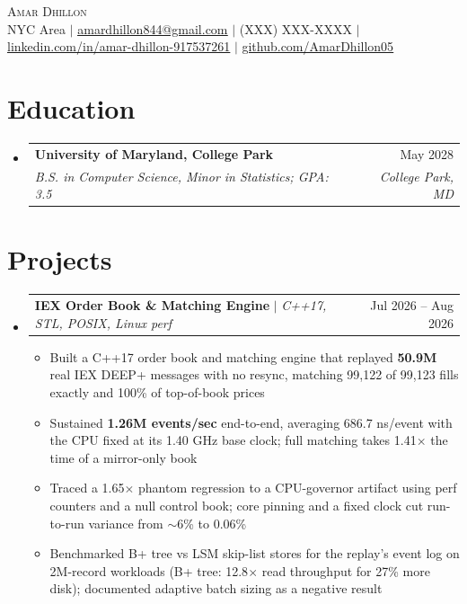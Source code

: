 \documentclass[letterpaper,10pt]{article}
\makeatletter
\newcommand{\resumeItem}[1]{\item{#1}\vspace{-1pt}}
\newcommand{\resumeSubheading}[4]{%
  \vspace{-1pt}\item
  \begin{tabular*}{\textwidth}[t]{l@{\extracolsep{\fill}}r}
    \textbf{#1} & #2 \\
    \textit{#3} & \textit{#4} \\
  \end{tabular*}\vspace{-6pt}%
}
\newcommand{\resumeProjectHeading}[2]{%
  \item
  \begin{tabular*}{\textwidth}{l@{\extracolsep{\fill}}r}
    #1 & #2 \\
  \end{tabular*}\vspace{-6pt}%
}
\newcommand{\resumeSubHeadingListStart}{\begin{itemize}[leftmargin=0in, label={}, itemsep=0pt, topsep=2pt]}
\newcommand{\resumeSubHeadingListEnd}{\end{itemize}}
\newcommand{\resumeItemListStart}{\begin{itemize}[leftmargin=0.18in, itemsep=0pt, topsep=1pt, parsep=0pt]}
\newcommand{\resumeItemListEnd}{\end{itemize}\vspace{0pt}}
\makeatother
\begin{document}
\begin{center}
  {\Huge\scshape\textcolor{accent}{Amar Dhillon}} \\ \vspace{3pt}
  \footnotesize
  NYC Area $|$
  \href{mailto:amardhillon844@gmail.com}{\underline{amardhillon844@gmail.com}} $|$
  (XXX) XXX-XXXX $|$
  \href{https://linkedin.com/in/amar-dhillon-917537261}{\underline{linkedin.com/in/amar-dhillon-917537261}} $|$
  \href{https://github.com/AmarDhillon05}{\underline{github.com/AmarDhillon05}}
\end{center}
\vspace{-6pt}

\section{Education}
\resumeSubHeadingListStart
  \resumeSubheading
    {University of Maryland, College Park}{May 2028}
    {B.S. in Computer Science, Minor in Statistics; GPA: 3.5}{College Park, MD}
\resumeSubHeadingListEnd

\section{Projects}
\resumeSubHeadingListStart
  \resumeProjectHeading
    {\textbf{IEX Order Book \& Matching Engine} $|$ \textit{C++17, STL, POSIX, Linux perf}}{Jul 2026 -- Aug 2026}
  \resumeItemListStart
    \resumeItem{Built a C++17 order book and matching engine that replayed \textbf{50.9M} real IEX DEEP+ messages with no resync, matching 99,122 of 99,123 fills exactly and 100\% of top-of-book prices}
    \resumeItem{Sustained \textbf{1.26M events/sec} end-to-end, averaging 686.7 ns/event with the CPU fixed at its 1.40 GHz base clock; full matching takes 1.41$\times$ the time of a mirror-only book}
    \resumeItem{Traced a 1.65$\times$ phantom regression to a CPU-governor artifact using perf counters and a null control book; core pinning and a fixed clock cut run-to-run variance from $\sim$6\% to 0.06\%}
    \resumeItem{Benchmarked B+ tree vs LSM skip-list stores for the replay's event log on 2M-record workloads (B+ tree: 12.8$\times$ read throughput for 27\% more disk); documented adaptive batch sizing as a negative result}
  \resumeItemListEnd
\resumeSubHeadingListEnd
\end{document}
